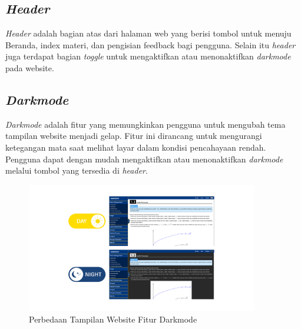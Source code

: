 \documentclass{file/KP-ITS}
\theoremstyle{definition}
\theoremstyle{definition}
\theoremstyle{plain}
\begin{document}
\subsection{\textit{Header}}
\textit{Header} adalah bagian atas dari halaman web yang berisi tombol untuk menuju Beranda, index materi, dan pengisian feedback bagi pengguna. Selain itu \textit{header} juga terdapat bagian \textit{toggle} untuk mengaktifkan atau menonaktifkan \textit{darkmode} pada website.

\subsection{\textit{Darkmode}}
\textit{Darkmode} adalah fitur yang memungkinkan pengguna untuk mengubah tema tampilan website menjadi gelap. Fitur ini dirancang untuk mengurangi ketegangan mata saat melihat layar dalam kondisi pencahayaan rendah. Pengguna dapat dengan mudah mengaktifkan atau menonaktifkan \textit{darkmode} melalui tombol yang tersedia di \textit{header}.
\begin{figure}[h!]
    \centering
    \includegraphics[width=0.9\textwidth]{foto/LightDarkMode.png}
    \caption{Perbedaan Tampilan Website Fitur Darkmode}
\end{figure}
\end{document}
